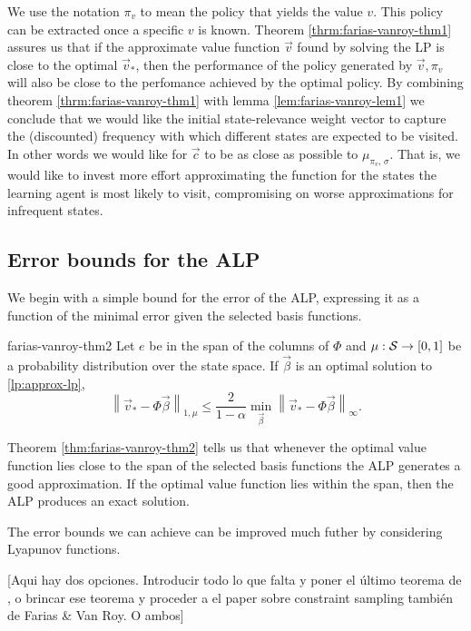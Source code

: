 We use the notation $\pi_v$ to mean the policy that yields the value $v$. This
policy can be extracted once a specific $v$ is known. Theorem
\ref{thrm:farias-vanroy-thm1} assures us that if the approximate value function
$\vec{v}$ found by solving the LP is close to the optimal $\vec{v}_{*}$, then
the performance of the policy generated by $\vec{v}, \pi_v$  will also be close
to the perfomance achieved by the optimal policy. By combining theorem
\ref{thrm:farias-vanroy-thm1} with lemma \ref{lem:farias-vanroy-lem1} we
conclude that we would like the initial state-relevance weight vector to capture
the (discounted) frequency with which different states are expected to be
visited. In other words we would like for $\vec{c}$ to be as close as possible
to $\mu_{\pi_v, \, \sigma}$. That is, we would like to invest more effort
approximating the function for the states the learning agent is most likely to
visit, compromising on worse approximations for infrequent states.

\subsection{Error bounds for the ALP}
We begin with a simple bound for the error of the ALP, expressing it as a
function of the minimal error given the selected basis functions.

\begin{thrm}{}{farias-vanroy-thm2}
    Let $e$ be in the span of the columns of $\Phi$ and $\mu: \mathcal{S} \to [0,1]$
    be a probability distribution over the state space. If $\vec{\beta}$ is an
    optimal solution to \eqref{lp:approx-lp},
    \begin{equation*}
        \left\| \vec{v}_* - \Phi \vec{\beta} \right\|_{1, \mu} \leq \frac{2}{1-\alpha} \min_{\vec{\beta}} \left\| \vec{v}_* - \Phi \vec{\beta} \right\|_{\infty}.
    \end{equation*}
\end{thrm}

Theorem \ref{thm:farias-vanroy-thm2} tells us that whenever the optimal value
function lies close to the span of the selected basis functions the ALP
generates a good approximation. If the optimal value function lies within the
span, then the ALP produces an exact solution.

The error bounds we can achieve can be improved much futher by considering Lyapunov functions.

[Aqui hay dos opciones. Introducir todo lo que falta y poner el último teorema
de , o brincar ese teorema y proceder a el paper
sobre constraint sampling también de Farias \& Van Roy. O ambos]
